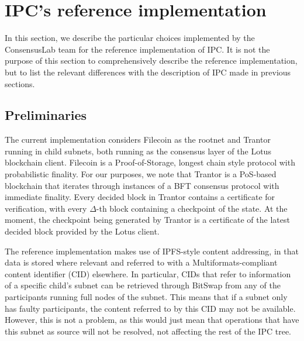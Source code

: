  \section{IPC's reference implementation}
 \label{sec:ref-impl}
 
 
 In this section, we describe the particular choices implemented by the ConsensusLab team for the reference implementation of IPC. It is not the purpose of this section to comprehensively describe the reference implementation, but to list the relevant differences with the description of IPC made in previous sections. 

 \subsection{Preliminaries}
 The current implementation considers Filecoin as the rootnet and Trantor running in child subnets, both running as the consensus layer of the Lotus blockchain client. Filecoin is a Proof-of-Storage, longest chain style protocol with probabilistic finality.
 For our purposes, we note that Trantor is a PoS-based blockchain that iterates through instances of a BFT consensus protocol with immediate finality. Every decided block in Trantor contains a certificate for verification, with every $\Delta$-th block containing a checkpoint of the state. At the moment, the checkpoint being generated by Trantor is a certificate of the latest decided block provided by the Lotus client.
 
 The reference implementation makes use of IPFS-style content addressing, in that data is stored where relevant and referred to with a Multiformats-compliant content identifier (CID) elsewhere. In particular, CIDs that refer to information of a specific child's subnet can be retrieved through BitSwap from any of the participants running full nodes of the subnet. This means that if a subnet only has faulty participants, the content referred to by this CID may not be available. However, this is not a problem, as this would just mean that operations that have this subnet as source will not be resolved, not affecting the rest of the IPC tree. 

